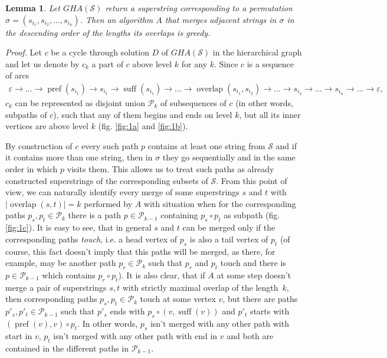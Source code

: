 \documentclass[11pt]{article}
\newtheorem{lem}{Lemma}
\DeclareMathOperator{\suff}{suff}
\DeclareMathOperator{\pref}{pref}
\DeclareMathOperator{\overlap}{overlap}
\begin{document}
	\begin{lem}
		Let $GHA(\mathcal{S})$ return a superstring corresponding to a permutation $\sigma = (s_{i_1}, s_{i_2}, \dots, s_{i_n})$. Then an algorithm $A$ that merges adjacent strings in $\sigma$ in the descending order of the lengths its overlaps is greedy.
	\end{lem}
	{\em Proof.} Let $c$ be a cycle through solution $D$ of $GHA(\mathcal{S})$ in the hierarchical graph and let us denote by $c_k$ a part of $c$ above level $k$ for any $k$. Since $c$ is a sequence of arcs
	\begin{gather*}
		\varepsilon \to \dots \to \pref(s_{i_1}) \to s_{i_1} \to \suff(s_{i_1}) \to \dots \to \overlap(s_{i_1}, s_{i_2}) \to \dots \to s_{i_2} \to \dots \to s_{i_n} \to \dots \to \varepsilon,
	\end{gather*}
	$c_k$ can be represented as disjoint union $\mathcal{P}_k$ of subsequences of $c$ (in other words, subpaths of $c$), such that any of them begins and ends on level $k$, but all its inner vertices are above level $k$ (fig. \ref{fig:1a} and \ref{fig:1b}).
	
	By construction of $c$ every such path $p$ contains at least one string from $\mathcal{S}$ and if it contains more than one string, then in $\sigma$ they go sequentially and in the same order in which $p$ visits them. This allows us to treat such paths as already constructed superstrings of the corresponding subsets of $\mathcal{S}$. From this point of view, we can naturally identify every merge of  some superstrings $s$ and $t$ with $|\overlap(s,t)| = k$ performed by $A$ with situation when for the corresponding paths $p_s, p_t \in \mathcal{P}_k$ there is a path $p \in \mathcal{P}_{k-1}$ containing $p_s \circ p_t$ as subpath (fig. \ref{fig:1c}). It is easy to see, that in general $s$ and $t$ can be merged only if the corresponding paths {\em touch}, i.e. a head vertex of $p_s$ is also a tail vertex of  $p_t$ (of course, this fact doesn't imply that this paths will be merged, as there, for example, may be another path $p_r \in \mathcal{P}_k$ such that $p_r$ and $p_t$ touch and there is $p \in \mathcal{P}_{k-1}$ which contains $p_r \circ p_t$). It is also clear, that if $A$ at some step doesn't merge a pair of superstrings $s, t$ with strictly maximal overlap of the length~$k$, then corresponding paths $p_s, p_t \in \mathcal{P}_k$ touch at some vertex $v$, but there are paths $p'_s, p'_t \in \mathcal{P}_{k-1}$ such that $p'_s$ ends with $p_s \circ (v, \suff(v))$ and $p'_t$ starts with $(\pref(v), v) \circ p_t$. In other words, $p_s$ isn't merged with any other path with start in $v$, $p_t$ isn't merged with any other path with end in $v$ and both are contained in the different paths in $\mathcal{P}_{k-1}$.
	
\end{document}
